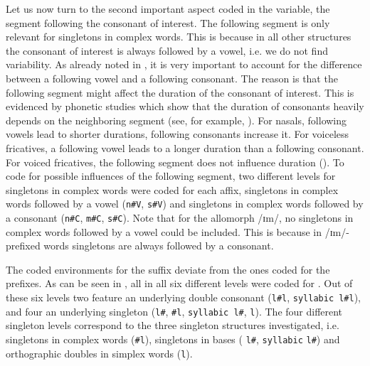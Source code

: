Let us now turn to the second important aspect coded in the variable, the segment following the consonant of interest. The following segment is only relevant for singletons in complex words. This is because in all other structures the  consonant of interest is always followed by a vowel, i.e. we do not find variability.  
As already noted in , it is very important to account for the difference between a following vowel and a following consonant. The reason is that the following segment might affect the duration of the consonant of interest. This is evidenced by phonetic studies which show that the duration of consonants heavily depends on the neighboring segment (see, for example, \citealt{Umeda.1977}).  For nasals,  following vowels lead to shorter durations, following consonants increase it. For voiceless fricatives, a following vowel leads to a longer duration than a following consonant. For voiced fricatives, the following segment does not influence duration (\citealt[854]{Umeda.1977}). To code for possible influences of the following segment, two different levels for singletons in complex words were coded for each affix, singletons in complex words followed by a vowel (\texttt{n\#V}, \texttt{s\#V}) and singletons in complex words followed by a consonant (\texttt{n\#C}, \texttt{m\#C}, \texttt{s\#C}). Note that for the allomorph /ɪm/, no singletons in complex words followed by a vowel could be included. This is because in /ɪm/-prefixed words singletons are always followed by a consonant.


The coded environments for the suffix  deviate from the ones coded for the prefixes. 
As can be seen in , all in all six different levels were coded for . Out of these six levels two feature an underlying double consonant (\texttt{l\#l}, \texttt{syllabic l\#l}), and four an underlying singleton  (\texttt{l\#},  \texttt{\#l}, \texttt{syllabic l\#}, \texttt{l}). The four different singleton levels correspond to the three singleton structures investigated, i.e. singletons in complex words (\texttt{\#l}), singletons in bases ( \texttt{l\#}, \texttt{syllabic} \texttt{l\#}) and orthographic doubles in simplex words (\texttt{l}).

